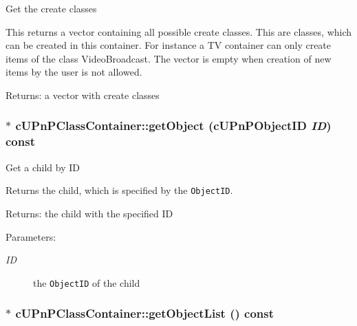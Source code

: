 Get the create classes

This returns a vector containing all possible create classes. This are classes, which can be created in this container. For instance a TV container can only create items of the class VideoBroadcast. The vector is empty when creation of new items by the user is not allowed.

\begin{Desc}
\item[Returns:]a vector with create classes \end{Desc}
\hypertarget{classcUPnPClassContainer_b2d43f5d5b6ad40d444b7e353979451d}{
\subsubsection[{getObject}]{ $\ast$ cUPnPClassContainer::getObject ({\bf cUPnPObjectID} {\em ID}) const}}
\label{classcUPnPClassContainer_b2d43f5d5b6ad40d444b7e353979451d}


Get a child by ID

Returns the child, which is specified by the {\tt ObjectID}.

\begin{Desc}
\item[Returns:]the child with the specified ID \end{Desc}
\begin{Desc}
\item[Parameters:]
\begin{description}
\item[{\em ID}]the {\tt ObjectID} of the child \end{description}
\end{Desc}
\hypertarget{classcUPnPClassContainer_ba09b831bbb533d1dbcb6cff4f4b9c23}{
\subsubsection[{getObjectList}]{$\ast$ cUPnPClassContainer::getObjectList () const}}
\label{classcUPnPClassContainer_ba09b831bbb533d1dbcb6cff4f4b9c23}


